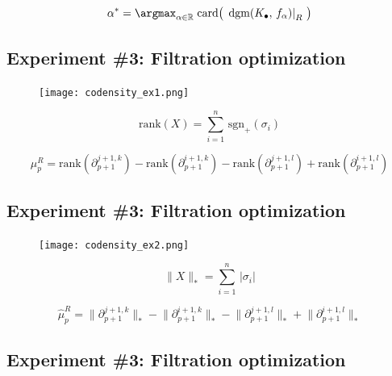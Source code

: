 \documentclass[
  letterpaper,
  DIV=11,
  numbers=noendperiod,
  oneside]{scrartcl}
\begin{document}
\[ 
\alpha^\ast = \argmax_{\alpha \in \mathbb{R}} \; \mathrm{card}\big(\, \left.\mathrm{dgm}(K_\bullet, \, f_\alpha) \right|_{R} \, \big) 
\]

\hypertarget{experiment-3-filtration-optimization-2}{%
\subsection{Experiment \#3: Filtration
optimization}\label{experiment-3-filtration-optimization-2}}

\begin{figure}

{\centering \texttt{[image: codensity\_ex1.png]}

}

\end{figure}

\[
\mathrm{rank}(X) = \sum\limits_{i=1}^{n} \, \mathrm{sgn}_+(\sigma_i)
\]

\[ 
\mu_p^{R} = \mathrm{rank}(\partial_{p+1}^{j + 1, k})  - \mathrm{rank}(\partial_{p+1}^{i + 1, k})  - \mathrm{rank}(\partial_{p+1}^{j + 1, l}) + \mathrm{rank}(\partial_{p+1}^{i + 1, l})  
\]

\hypertarget{experiment-3-filtration-optimization-3}{%
\subsection{Experiment \#3: Filtration
optimization}\label{experiment-3-filtration-optimization-3}}

\begin{figure}

{\centering \texttt{[image: codensity\_ex2.png]}

}

\end{figure}

\[
\lVert X \rVert_\ast = \sum\limits_{i=1}^{n} \, \lvert \sigma_i \rvert 
\]

\[ 
\hat{\mu}_p^{R} = \lVert \partial_{p+1}^{j + 1, k}\rVert_\ast  -  \lVert \partial_{p+1}^{i + 1, k}\rVert_\ast  -  \lVert \partial_{p+1}^{j + 1, l}\rVert_\ast +  \lVert \partial_{p+1}^{i + 1, l} \rVert_\ast
\]

\hypertarget{experiment-3-filtration-optimization-4}{%
\subsection{Experiment \#3: Filtration
optimization}\label{experiment-3-filtration-optimization-4}}
\end{document}

